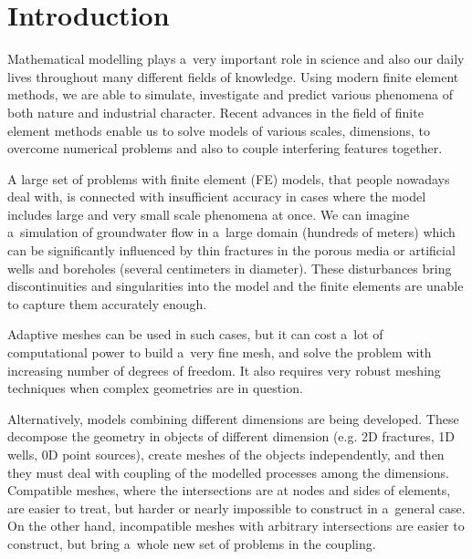 \documentclass[bibliography=totocnumbered,dvipsnames,FM,Dis]{tulthesis}
\begin{document}


\chapter{Introduction}





Mathematical modelling plays a~very important role in science and also our daily lives throughout many different
fields of knowledge. Using modern finite element methods, we are able to simulate, investigate and predict
various phenomena of both nature and industrial character. Recent advances in the field of finite element methods
enable us to solve models of various scales, dimensions, to overcome numerical problems and also 
to couple interfering features together.

A large set of problems with finite element (FE) models, that people nowadays deal with, is connected with 
insufficient accuracy in cases where the model includes large and very small scale phenomena at once.
We can imagine a~simulation of groundwater flow in a~large domain (hundreds of meters) which can be significantly
influenced by thin fractures in the porous media or artificial wells and boreholes (several centimeters in diameter).
These disturbances bring discontinuities and singularities into the model and the finite elements are
unable to capture them accurately enough.

Adaptive meshes can be used in such cases, but it can cost a~lot of computational power to build a~very fine mesh,
and solve the problem with increasing number of degrees of freedom.
It also requires very robust meshing techniques when complex geometries are in question.

Alternatively, models combining different dimensions are being developed. These decompose the geometry
in objects of different dimension (e.g. 2D fractures, 1D wells, 0D point sources), create meshes of the objects independently,
and then they must deal with coupling of the modelled processes among the dimensions. 
Compatible meshes, where the intersections are at nodes and sides of elements, are easier to treat, but harder
or nearly impossible to construct in a~general case. On the other hand, incompatible meshes with arbitrary intersections are easier to construct, 
but bring a~whole new set of problems in the coupling.
\end{document}
